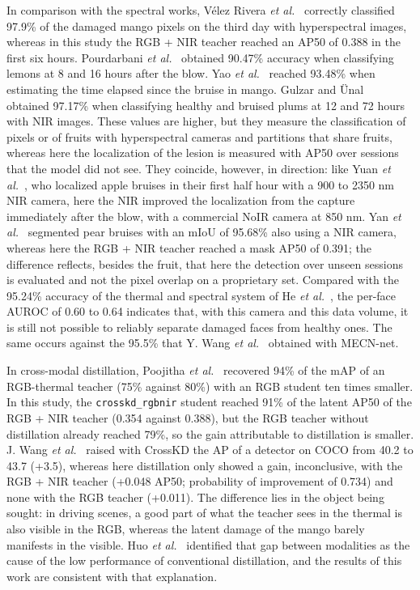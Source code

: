 \documentclass[journal]{IEEEtran}
\begin{document}
In comparison with the spectral works, V\'elez Rivera \emph{et al.}~\cite{velez2014} correctly classified 97.9\% of the damaged mango pixels on the third day with hyperspectral images, whereas in this study the RGB + NIR teacher reached an AP50 of 0.388 in the first six hours. Pourdarbani \emph{et al.}~\cite{pourdarbani2023} obtained 90.47\% accuracy when classifying lemons at 8 and 16 hours after the blow. Yao \emph{et al.}~\cite{yao2024} reached 93.48\% when estimating the time elapsed since the bruise in mango. Gulzar and \"Unal~\cite{gulzar2025} obtained 97.17\% when classifying healthy and bruised plums at 12 and 72 hours with NIR images. These values are higher, but they measure the classification of pixels or of fruits with hyperspectral cameras and partitions that share fruits, whereas here the localization of the lesion is measured with AP50 over sessions that the model did not see. They coincide, however, in direction: like Yuan \emph{et al.}~\cite{yuan2022}, who localized apple bruises in their first half hour with a 900 to 2350 nm NIR camera, here the NIR improved the localization from the capture immediately after the blow, with a commercial NoIR camera at 850 nm. Yan \emph{et al.}~\cite{yan2025} segmented pear bruises with an mIoU of 95.68\% also using a NIR camera, whereas here the RGB + NIR teacher reached a mask AP50 of 0.391; the difference reflects, besides the fruit, that here the detection over unseen sessions is evaluated and not the pixel overlap on a proprietary set. Compared with the 95.24\% accuracy of the thermal and spectral system of He \emph{et al.}~\cite{he2025}, the per-face AUROC of 0.60 to 0.64 indicates that, with this camera and this data volume, it is still not possible to reliably separate damaged faces from healthy ones. The same occurs against the 95.5\% that Y. Wang \emph{et al.}~\cite{wang2025} obtained with MECN-net.

In cross-modal distillation, Poojitha \emph{et al.}~\cite{poojitha2026} recovered 94\% of the mAP of an RGB-thermal teacher (75\% against 80\%) with an RGB student ten times smaller. In this study, the \texttt{crosskd\_\allowbreak rgbnir} student reached 91\% of the latent AP50 of the RGB + NIR teacher (0.354 against 0.388), but the RGB teacher without distillation already reached 79\%, so the gain attributable to distillation is smaller. J. Wang \emph{et al.}~\cite{wang2024} raised with CrossKD the AP of a detector on COCO from 40.2 to 43.7 (+3.5), whereas here distillation only showed a gain, inconclusive, with the RGB + NIR teacher (+0.048 AP50; probability of improvement of 0.734) and none with the RGB teacher (+0.011). The difference lies in the object being sought: in driving scenes, a good part of what the teacher sees in the thermal is also visible in the RGB, whereas the latent damage of the mango barely manifests in the visible. Huo \emph{et al.}~\cite{huo2024} identified that gap between modalities as the cause of the low performance of conventional distillation, and the results of this work are consistent with that explanation.
\end{document}
